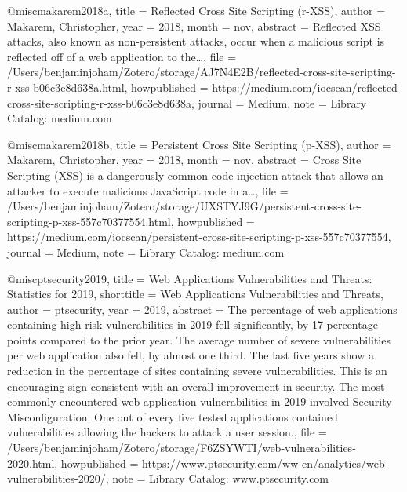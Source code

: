 @misc{makarem2018a,
  title = {Reflected {{Cross Site Scripting}} (r-{{XSS}})},
  author = {Makarem, Christopher},
  year = {2018},
  month = nov,
  abstract = {Reflected XSS attacks, also known as non-persistent attacks, occur when a malicious script is reflected off of a web application to the\ldots{}},
  file = {/Users/benjaminjoham/Zotero/storage/AJ7N4E2B/reflected-cross-site-scripting-r-xss-b06c3e8d638a.html},
  howpublished = {https://medium.com/iocscan/reflected-cross-site-scripting-r-xss-b06c3e8d638a},
  journal = {Medium},
  note = {Library Catalog: medium.com}
}

@misc{makarem2018b,
  title = {Persistent {{Cross Site Scripting}} (p-{{XSS}})},
  author = {Makarem, Christopher},
  year = {2018},
  month = nov,
  abstract = {Cross Site Scripting (XSS) is a dangerously common code injection attack that allows an attacker to execute malicious JavaScript code in a\ldots{}},
  file = {/Users/benjaminjoham/Zotero/storage/UXSTYJ9G/persistent-cross-site-scripting-p-xss-557c70377554.html},
  howpublished = {https://medium.com/iocscan/persistent-cross-site-scripting-p-xss-557c70377554},
  journal = {Medium},
  note = {Library Catalog: medium.com}
}

@misc{ptsecurity2019,
  title = {Web {{Applications}} Vulnerabilities and Threats: Statistics for 2019},
  shorttitle = {Web {{Applications}} Vulnerabilities and Threats},
  author = {{ptsecurity}},
  year = {2019},
  abstract = {The percentage of web applications containing high-risk vulnerabilities in 2019 fell significantly, by 17 percentage points compared to the prior year. The average number of severe vulnerabilities per web application also fell, by almost one third. The last five years show a reduction in the percentage of sites containing severe vulnerabilities. This is an encouraging sign consistent with an overall improvement in security. The most commonly encountered web application vulnerabilities in 2019 involved Security Misconfiguration. One out of every five tested applications contained vulnerabilities allowing the hackers to attack a user session.},
  file = {/Users/benjaminjoham/Zotero/storage/F6ZSYWTI/web-vulnerabilities-2020.html},
  howpublished = {https://www.ptsecurity.com/ww-en/analytics/web-vulnerabilities-2020/},
  note = {Library Catalog: www.ptsecurity.com}
}


